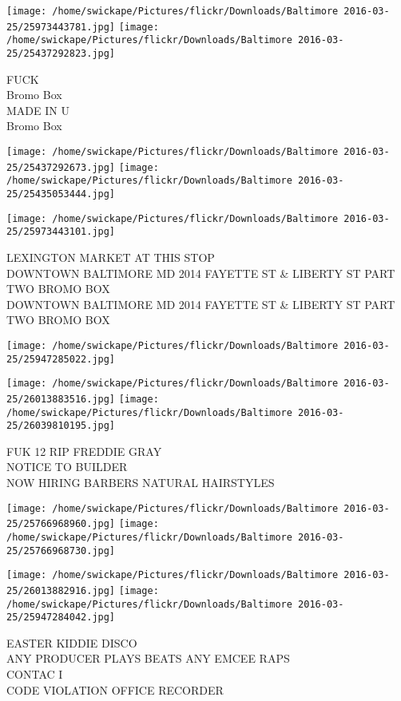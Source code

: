 \documentclass[10pt,letterpaper]{article}
\begin{document}
\texttt{[image: /home/swickape/Pictures/flickr/Downloads/Baltimore 2016-03-25/25973443781.jpg]}
\texttt{[image: /home/swickape/Pictures/flickr/Downloads/Baltimore 2016-03-25/25437292823.jpg]}

FUCK\\
Bromo Box\\
MADE IN U\\
Bromo Box
\pagebreak

\texttt{[image: /home/swickape/Pictures/flickr/Downloads/Baltimore 2016-03-25/25437292673.jpg]}
\texttt{[image: /home/swickape/Pictures/flickr/Downloads/Baltimore 2016-03-25/25435053444.jpg]}

\texttt{[image: /home/swickape/Pictures/flickr/Downloads/Baltimore 2016-03-25/25973443101.jpg]}

LEXINGTON MARKET AT THIS STOP\\
DOWNTOWN BALTIMORE MD 2014 FAYETTE ST \& LIBERTY ST PART TWO BROMO BOX\\
DOWNTOWN BALTIMORE MD 2014 FAYETTE ST \& LIBERTY ST PART TWO BROMO BOX
\pagebreak

\texttt{[image: /home/swickape/Pictures/flickr/Downloads/Baltimore 2016-03-25/25947285022.jpg]}

\vspace{0.25in}
\texttt{[image: /home/swickape/Pictures/flickr/Downloads/Baltimore 2016-03-25/26013883516.jpg]}
\texttt{[image: /home/swickape/Pictures/flickr/Downloads/Baltimore 2016-03-25/26039810195.jpg]}

FUK 12 RIP FREDDIE GRAY\\
NOTICE TO BUILDER\\
NOW HIRING BARBERS NATURAL HAIRSTYLES
\pagebreak

\texttt{[image: /home/swickape/Pictures/flickr/Downloads/Baltimore 2016-03-25/25766968960.jpg]}
\texttt{[image: /home/swickape/Pictures/flickr/Downloads/Baltimore 2016-03-25/25766968730.jpg]}

\texttt{[image: /home/swickape/Pictures/flickr/Downloads/Baltimore 2016-03-25/26013882916.jpg]}
\texttt{[image: /home/swickape/Pictures/flickr/Downloads/Baltimore 2016-03-25/25947284042.jpg]}

EASTER KIDDIE DISCO\\
ANY PRODUCER PLAYS BEATS ANY EMCEE RAPS\\
CONTAC I\\
CODE VIOLATION OFFICE RECORDER
\pagebreak
\end{document}
